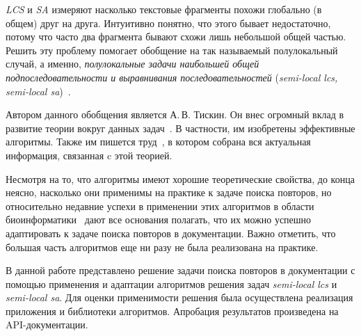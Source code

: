 \emph{LCS} и \emph{SA} измеряют насколько текстовые фрагменты похожи глобально (в общем) друг на друга. 
Интуитивно понятно, что этого бывает недостаточно, потому что часто два фрагмента бывают схожи лишь небольшой общей частью.
Решить эту проблему помогает обобщение на так называемый полулокальный случай, а именно, \emph{полулокальные задачи наибольшей общей подпоследовательности и выравнивания последовательностей} (\emph{semi-local lcs, semi-local sa})~\cite{tiskin2006all}.

Автором данного обобщения является А.\,В. Тискин.
Он внес огромный вклад в развитие теории вокруг данных задач~\cite{tiskin2015fast,tiskin2019bounded,krusche2009parallel,tiskin2006longest,tiskin2008semi,tiskin2011towards}.
В частности, им изобретены эффективные алгоритмы.
Также им пишется труд~\cite{tiskin2006all}, в котором собрана вся актуальная информация, связанная c этой теорией.




Несмотря на то, что алгоритмы имеют хорошие теоретические свойства, до конца неясно, насколько они применимы на практике к задаче поиска повторов, но
относительно недавние успехи в применении этих алгоритмов в области биоинформатики~\cite{baxter2012conserved,davies2015analysis, picot2010evolutionary} дают все основания полагать, что их можно успешно адаптировать к задаче поиска повторов в документации.
Важно отметить, что большая часть алгоритмов еще ни разу не была реализована на практике.

В данной работе представлено решение задачи поиска повторов в документации с помощью применения и адаптации алгоритмов решения задач \emph{semi-local lcs} и \emph{semi-local sa}. Для оценки применимости решения была осуществлена реализация приложения и библиотеки алгоритмов. Апробация результатов произведена на API-документации.


